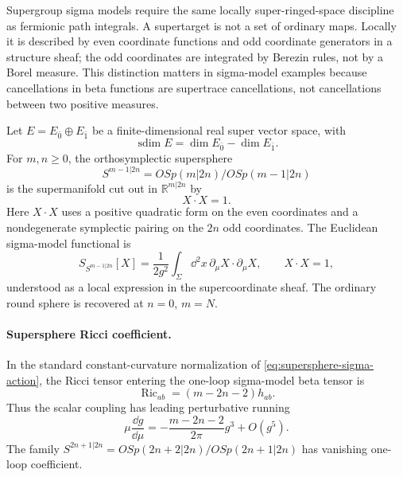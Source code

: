 Supergroup sigma models require the same locally super-ringed-space
discipline as fermionic path integrals.  A supertarget is not a set of
ordinary maps.  Locally it is described by even coordinate functions and odd
coordinate generators in a structure sheaf; the odd coordinates are integrated
by Berezin rules, not by a Borel measure.  This distinction matters in
sigma-model examples because cancellations in beta functions are supertrace
cancellations, not cancellations between two positive measures.

Let \(E=E_{\bar0}\oplus E_{\bar1}\) be a finite-dimensional real super vector
space, with
\[
  \operatorname{sdim}E=\dim E_{\bar0}-\dim E_{\bar1}.
\]
For \(m,n\ge0\), the orthosymplectic supersphere
\[
  S^{m-1|2n}
  =
  OSp(m|2n)/OSp(m-1|2n)
\]
is the supermanifold cut out in \(\mathbb R^{m|2n}\) by
\[
  X\cdot X=1.
\]
Here \(X\cdot X\) uses a positive quadratic form on the even coordinates and
a nondegenerate symplectic pairing on the \(2n\) odd coordinates.  The
Euclidean sigma-model functional is
\begin{equation}
  S_{S^{m-1|2n}}[X]
  =
  \frac1{2g^2}\int_\Sigma\dd^2x\,
  \partial_\mu X\cdot\partial_\mu X ,
  \qquad X\cdot X=1,
  \label{eq:supersphere-sigma-action}
\end{equation}
understood as a local expression in the supercoordinate sheaf.  The ordinary
round sphere is recovered at \(n=0\), \(m=N\).

\paragraph{Supersphere Ricci coefficient.}
In the standard constant-curvature normalization of
\eqref{eq:supersphere-sigma-action}, the Ricci tensor entering the one-loop
sigma-model beta tensor is
\begin{equation}
  \operatorname{Ric}_{ab}
  =
  (m-2n-2)h_{ab}.
  \label{eq:supersphere-ricci-coefficient}
\end{equation}
Thus the scalar coupling has leading perturbative running
\begin{equation}
  \mu\frac{\dd g}{\dd\mu}
  =
  -\frac{m-2n-2}{2\pi}g^3+O(g^5).
  \label{eq:supersphere-leading-beta}
\end{equation}
The family \(S^{2n+1|2n}=OSp(2n+2|2n)/OSp(2n+1|2n)\) has vanishing one-loop
coefficient.


